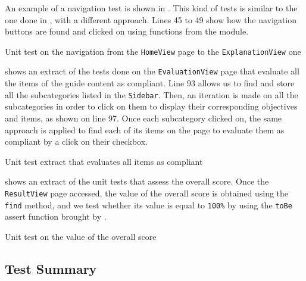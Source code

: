 An example of a navigation test is shown in . This kind of tests is similar to the one done in , with a different approach. Lines 45 to 49 show how the navigation buttons are found and clicked on using functions from the  module. 

\begin{listing}[!ht] 
	\caption{Unit test on the navigation from the \texttt{HomeView} page to the \texttt{ExplanationView} one}
	\label{lst:app_test_path_navigate}
\end{listing}

 shows an extract of the tests done on the \texttt{EvaluationView} page that evaluate all the items of the guide content as compliant. Line 93 allows us to find and store all the subcategories listed in the \texttt{Sidebar}. Then, an iteration is made on all the subcategories in order to click on them to display their corresponding objectives and items, as shown on line 97. Once each subcategory clicked on, the same approach is applied to find each of its items on the page to evaluate them as compliant by a click on their checkbox.

\begin{listing}[!ht] 
	\caption{Unit test extract that evaluates all items as compliant}
	\label{lst:app_test_path_items}
\end{listing}

 shows an extract of the unit tests that assess the overall score. Once the \texttt{ResultView} page accessed, the value of the overall score is obtained using the \texttt{find} method, and we test whether its value is equal to \texttt{100\%} by using the \texttt{toBe} assert function brought by .

\begin{listing}[!ht] 
	\caption{Unit test on the value of the overall score}
	\label{lst:app_test_score}
\end{listing}

\subsection{Test Summary}
\label{subsec:app_tests_summary}

